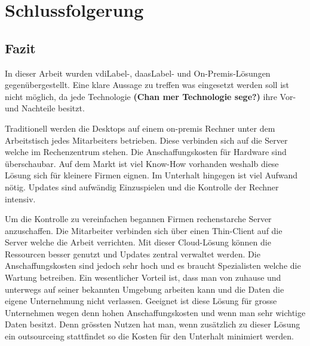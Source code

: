 \chapter{Schlussfolgerung}




\section{Fazit}
In dieser Arbeit wurden \Gls{vdiLabel}-, \Gls{daasLabel}- und On-Premis-Lösungen gegenübergestellt. Eine klare Aussage zu treffen was eingesetzt werden soll ist nicht möglich, da jede Technologie \textbf{(Chan mer Technologie sege?)} ihre Vor- und Nachteile besitzt.

Traditionell werden die Desktops auf einem on-premis Rechner unter dem Arbeitstisch jedes Mitarbeiters betrieben. Diese verbinden sich auf die Server welche im Rechenzentrum stehen. Die Anschaffungskosten für Hardware sind überschaubar. Auf dem Markt ist viel Know-How vorhanden weshalb diese Lösung sich für kleinere Firmen eignen. Im Unterhalt hingegen ist viel Aufwand nötig. Updates sind aufwändig Einzuspielen und die Kontrolle der Rechner intensiv.

Um die Kontrolle zu vereinfachen begannen Firmen rechenstarche Server anzuschaffen. Die Mitarbeiter verbinden sich über einen Thin-Client auf die Server welche die Arbeit verrichten. Mit dieser Cloud-Lösung können die Ressourcen besser genutzt und Updates zentral verwaltet werden. Die Anschaffungskosten sind jedoch sehr hoch und es braucht Spezialisten welche die Wartung betreiben. Ein wesentlicher Vorteil ist, dass man von zuhause und unterwegs auf seiner bekannten Umgebung arbeiten kann und die Daten die eigene Unternehmung nicht verlassen. Geeignet ist diese Lösung für grosse Unternehmen wegen denn hohen Anschaffungskosten und wenn man sehr wichtige Daten besitzt. Denn grössten Nutzen hat man, wenn zusätzlich zu dieser Lösung ein outsourceing stattfindet so die Kosten für den Unterhalt minimiert werden. 


